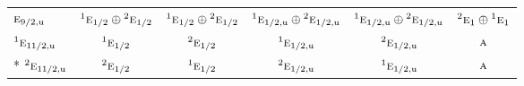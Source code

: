 \documentclass[10pt,a4paper]{article}
\numberwithin{equation}{section}
\newcommand{\irr}[1]{\text{\normalfont\scshape #1}}
\newcommand{\conjpair}[1]{{}^{#1}}
\newcommand{\ptag}[1]{\mathrm{#1}}
\begin{document}
{\begin{longtable}{@{}lccccc@{}}
$\irr{e}_{9/2,\ptag{u}}$ & $\conjpair{1}\irr{e}_{1/2}\oplus \conjpair{2}\irr{e}_{1/2}$ & $\conjpair{1}\irr{e}_{1/2}\oplus \conjpair{2}\irr{e}_{1/2}$ & $\conjpair{1}\irr{e}_{1/2,\ptag{u}}\oplus \conjpair{2}\irr{e}_{1/2,\ptag{u}}$ & $\conjpair{1}\irr{e}_{1/2,\ptag{u}}\oplus \conjpair{2}\irr{e}_{1/2,\ptag{u}}$ & $\conjpair{2}\irr{e}_{1}\oplus \conjpair{1}\irr{e}_{1}$\\
$\conjpair{1}\irr{e}_{11/2,\ptag{u}}$ & $\conjpair{1}\irr{e}_{1/2}$ & $\conjpair{2}\irr{e}_{1/2}$ & $\conjpair{1}\irr{e}_{1/2,\ptag{u}}$ & $\conjpair{2}\irr{e}_{1/2,\ptag{u}}$ & $\irr{a}$\\*
$\conjpair{2}\irr{e}_{11/2,\ptag{u}}$ & $\conjpair{2}\irr{e}_{1/2}$ & $\conjpair{1}\irr{e}_{1/2}$ & $\conjpair{2}\irr{e}_{1/2,\ptag{u}}$ & $\conjpair{1}\irr{e}_{1/2,\ptag{u}}$ & $\irr{a}$\\
\bottomrule\end{longtable}}
\end{document}
